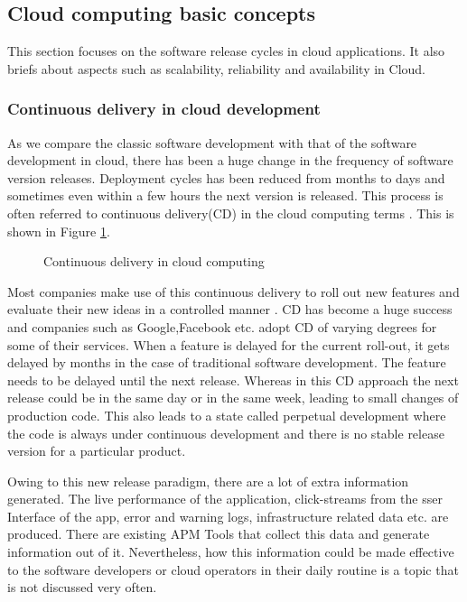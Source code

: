 \documentclass[article,type=msc,colorback,12pt,accentcolor=tud8b,table]{tudthesis}
\begin{document}
		\subsection{Cloud computing basic concepts}
		
		This section focuses on the software release cycles in cloud applications. It also briefs about aspects such as scalability, reliability and availability in Cloud.
		
		\subsubsection{Continuous delivery in cloud development}
		As we compare the classic software development with that of the software development in cloud, there has been a huge change in the frequency of software version releases. Deployment cycles has been reduced from months to days and sometimes even within a few hours the next version is released. This process is often referred to continuous delivery(CD) in the cloud computing terms \cite{humble2010continuous}. This is shown in Figure \ref{fig:cd}. 
		
		\begin{figure}
			\begin{center}
				\makebox[\textwidth]{\texttt{[image: 2-1]}}
			\end{center}
			\caption{Continuous delivery in cloud computing \cite{humble2010continuous}}
			\label{fig:cd}
		\end{figure}
		
		Most companies make use of this continuous delivery to roll out new features and evaluate their new ideas in a controlled manner \cite{kohavi2007practical}. CD has become a huge success and companies such as Google,Facebook etc. adopt CD of varying degrees for some of their services. When a feature is delayed for the current roll-out, it gets delayed by months in the case of traditional software development. The feature needs to be delayed until the next release. Whereas in this CD approach the next release could be in the same day or in the same week, leading to small changes of production code. This also leads to a state called perpetual development where the code is always under continuous development and there is no stable release version for a particular product.  	\par Owing to this new release paradigm, there are a lot of extra information generated. The live performance of the application, click-streams from the sser Interface of the app, error and warning logs, infrastructure related data etc. are produced. There are existing APM Tools that collect this data and generate information out of it. Nevertheless, how this information could be made effective to the software developers or cloud operators in their daily routine is a topic that is not discussed very often. 
		
\end{document}

